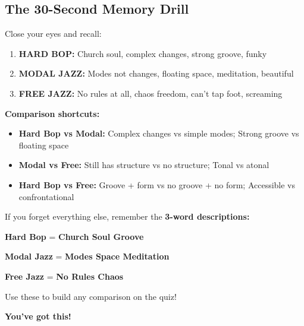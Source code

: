 \documentclass[11pt]{article}
\begin{document}
\subsection*{The 30-Second Memory Drill}

Close your eyes and recall:

\begin{enumerate}[leftmargin=*]
    \item \textbf{\textcolor{hardbop}{HARD BOP:}} Church soul, complex changes, strong groove, funky
    \item \textbf{\textcolor{modal}{MODAL JAZZ:}} Modes not changes, floating space, meditation, beautiful
    \item \textbf{\textcolor{freejazz}{FREE JAZZ:}} No rules at all, chaos freedom, can't tap foot, screaming
\end{enumerate}

\textbf{Comparison shortcuts:}
\begin{itemize}[leftmargin=*]
    \item \textbf{Hard Bop vs Modal:} Complex changes vs simple modes; Strong groove vs floating space
    \item \textbf{Modal vs Free:} Still has structure vs no structure; Tonal vs atonal
    \item \textbf{Hard Bop vs Free:} Groove + form vs no groove + no form; Accessible vs confrontational
\end{itemize}

\vspace{15pt}

\begin{center}
\begin{tcolorbox}[colback=green!10, colframe=green!50!black, width=0.9\textwidth, title=\textbf{FINAL TIP FOR QUIZ DAY}]
If you forget everything else, remember the \textbf{3-word descriptions:}

\textbf{\textcolor{hardbop}{Hard Bop}} = \textbf{Church Soul Groove}

\textbf{\textcolor{modal}{Modal Jazz}} = \textbf{Modes Space Meditation}

\textbf{\textcolor{freejazz}{Free Jazz}} = \textbf{No Rules Chaos}

Use these to build any comparison on the quiz!
\end{tcolorbox}
\end{center}

\vspace{20pt}

\begin{center}
\Large \textbf{You've got this! 🎵}
\end{center}
\end{document}
